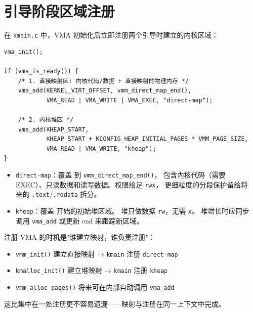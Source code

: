 \section{引导阶段区域注册}
\label{sec:vma-boot}

在 \texttt{kmain.c} 中，VMA 初始化后立即注册两个引导时建立的内核区域：

\begin{lstlisting}[style=cstyle]
vma_init();

if (vma_is_ready()) {
    /* 1. 直接映射区: 内核代码/数据 + 直接映射的物理内存 */
    vma_add(KERNEL_VIRT_OFFSET, vmm_direct_map_end(),
            VMA_READ | VMA_WRITE | VMA_EXEC, "direct-map");

    /* 2. 内核堆区 */
    vma_add(KHEAP_START,
            KHEAP_START + KCONFIG_HEAP_INITIAL_PAGES * VMM_PAGE_SIZE,
            VMA_READ | VMA_WRITE, "kheap");
}
\end{lstlisting}

\begin{itemize}
  \item \texttt{direct-map}：覆盖  到 \texttt{vmm\_direct\_map\_end()}，
        包含内核代码（需要 EXEC）、只读数据和读写数据。权限给足 \texttt{rwx}，
        更细粒度的分段保护留给将来的 \texttt{.text}/\texttt{.rodata} 拆分。

  \item \texttt{kheap}：覆盖  开始的初始堆区域。
        堆只做数据 \texttt{rw}，无需 \texttt{x}。
        堆增长时应同步调用 \texttt{vma\_add} 或更新 end 来跟踪新区域。
\end{itemize}

\begin{designbox}
注册 VMA 的时机是"谁建立映射，谁负责注册"：
\begin{itemize}
  \item \texttt{vmm\_init()} 建立直接映射 → \texttt{kmain} 注册 \texttt{direct-map}
  \item \texttt{kmalloc\_init()} 建立堆映射 → \texttt{kmain} 注册 \texttt{kheap}
  \item \texttt{vmm\_alloc\_pages()} 将来可在内部自动调用 \texttt{vma\_add}
\end{itemize}
这比集中在一处注册更不容易遗漏——映射与注册在同一上下文中完成。
\end{designbox}


